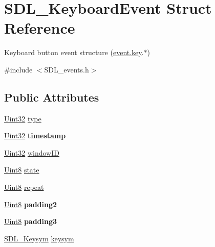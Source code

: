 \hypertarget{structSDL__KeyboardEvent}{}\section{S\+D\+L\+\_\+\+Keyboard\+Event Struct Reference}
\label{structSDL__KeyboardEvent}


Keyboard button event structure (\hyperlink{unionSDL__Event_ab99927835cc77a9b6bb50b419b4a27df}{event.\+key}.$\ast$)  




{\ttfamily \#include $<$S\+D\+L\+\_\+events.\+h$>$}

\subsection*{Public Attributes}
\begin{DoxyCompactItemize}
\item 
\hyperlink{SDL__stdinc_8h_add440eff171ea5f55cb00c4a9ab8672d}{Uint32} \hyperlink{structSDL__KeyboardEvent_ae0b2f2aace6f80c1f47e5a14350d409a}{type}
\item 
\hypertarget{structSDL__KeyboardEvent_a3da1d8f6892e7f6ee28d9eafdb5e7d02}{}\hyperlink{SDL__stdinc_8h_add440eff171ea5f55cb00c4a9ab8672d}{Uint32} {\bfseries timestamp}\label{structSDL__KeyboardEvent_a3da1d8f6892e7f6ee28d9eafdb5e7d02}

\item 
\hyperlink{SDL__stdinc_8h_add440eff171ea5f55cb00c4a9ab8672d}{Uint32} \hyperlink{structSDL__KeyboardEvent_a56efb6780b96acd5b50d8f797efb3546}{window\+I\+D}
\item 
\hyperlink{SDL__stdinc_8h_a2944638813a090aa23e62f4da842c3e2}{Uint8} \hyperlink{structSDL__KeyboardEvent_a110558eb96c113c86cfa31a7018c2346}{state}
\item 
\hyperlink{SDL__stdinc_8h_a2944638813a090aa23e62f4da842c3e2}{Uint8} \hyperlink{structSDL__KeyboardEvent_a3edac3b36304812d533795c9df4ed4c1}{repeat}
\item 
\hypertarget{structSDL__KeyboardEvent_ae270122f757f76171318294afd2c95e6}{}\hyperlink{SDL__stdinc_8h_a2944638813a090aa23e62f4da842c3e2}{Uint8} {\bfseries padding2}\label{structSDL__KeyboardEvent_ae270122f757f76171318294afd2c95e6}

\item 
\hypertarget{structSDL__KeyboardEvent_ae1831035ef556a7b09efcd2469f26f7a}{}\hyperlink{SDL__stdinc_8h_a2944638813a090aa23e62f4da842c3e2}{Uint8} {\bfseries padding3}\label{structSDL__KeyboardEvent_ae1831035ef556a7b09efcd2469f26f7a}

\item 
\hyperlink{structSDL__Keysym}{S\+D\+L\+\_\+\+Keysym} \hyperlink{structSDL__KeyboardEvent_a2a57ba820a298f2c02ad5d41fd2b1aa8}{keysym}
\end{DoxyCompactItemize}


